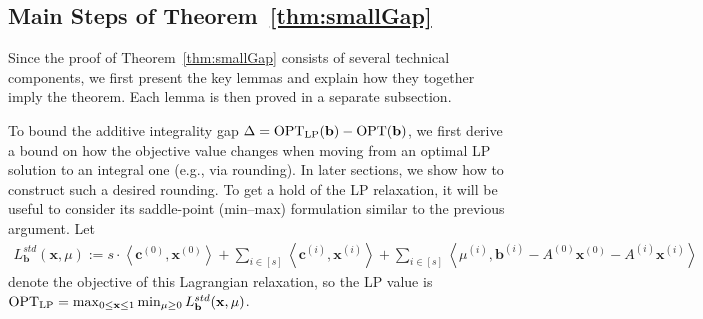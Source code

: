 \documentclass{article}
\newcommand{\cv}[0]{\mathbf{c}}
\newcommand{\xv}[0]{\mathbf{x}}
\newcommand{\bv}[0]{\mathbf{b}}
\newcommand{\iprod}[2]{\left\langle {#1}, {#2} \right\rangle}
\newcommand{\OPT}{\textup{OPT}}
\begin{document}
\subsection{Main Steps of Theorem~\ref{thm:smallGap}} 
\label{sec:steps_of_prf_int_gap}

Since the proof of Theorem~\ref{thm:smallGap} consists of several technical components, we first present the key lemmas and explain how they together imply the theorem. Each lemma is then proved in a separate subsection.

To bound the additive integrality gap 
$\Delta = \OPT_{\mathrm{LP}}(\bv) - \OPT(\bv)$,
we first derive a bound on how the objective value changes when moving from an optimal LP solution to an integral one (e.g., via rounding). In later sections, we show how to construct such a desired rounding.
To get a hold of the LP relaxation, it will be useful to consider its saddle-point (min–max) formulation similar to the previous argument. Let 
%
\begin{align}
L^{std}_{\bv}(\xv,\mu) := s \cdot \iprod{\cv^{(0)}}{\xv^{(0)}} + \sum_{i \in [s]} \iprod{\cv^{(i)}}{\xv^{(i)}} + \sum_{i \in [s]} \iprod{\mu^{(i)}}{\bv^{(i)} - A^{(0)} \xv^{(0)} - A^{(i)} \xv^{(i)} } \label{eq:lagStd}
\end{align}
denote the objective of this Lagrangian relaxation, so the LP value is $\OPT_{\textup{LP}} = \max_{0 \le \xv \le 1} \min_{\mu \ge 0} L^{std}_{\bv}(\xv,\mu)$.
\end{document}
